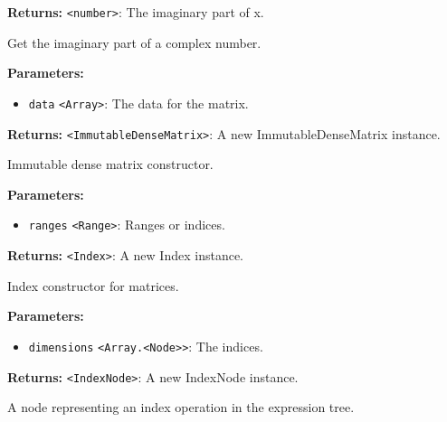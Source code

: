 \documentclass[12pt,a4paper]{article}
\begin{document}
\noindent \textbf{Returns:} \texttt{<number>}: The imaginary part of x.

\noindent Get the imaginary part of a complex number.

\vspace{5mm}
\noindent {}


\noindent \textbf{Parameters:}
\begin{itemize}
  \item \texttt{data} \texttt{<Array>}: The data for the matrix.
\end{itemize}

\noindent \textbf{Returns:} \texttt{<ImmutableDenseMatrix>}: A new ImmutableDenseMatrix instance.

\noindent Immutable dense matrix constructor.

\vspace{5mm}
\noindent {}


\noindent \textbf{Parameters:}
\begin{itemize}
  \item \texttt{ranges} \texttt{<Range>}: Ranges or indices.
\end{itemize}

\noindent \textbf{Returns:} \texttt{<Index>}: A new Index instance.

\noindent Index constructor for matrices.

\vspace{5mm}
\noindent {}


\noindent \textbf{Parameters:}
\begin{itemize}
  \item \texttt{dimensions} \texttt{<Array.<Node>>}: The indices.
\end{itemize}

\noindent \textbf{Returns:} \texttt{<IndexNode>}: A new IndexNode instance.

\noindent A node representing an index operation in the expression tree.

\vspace{5mm}
\noindent {}
\end{document}
